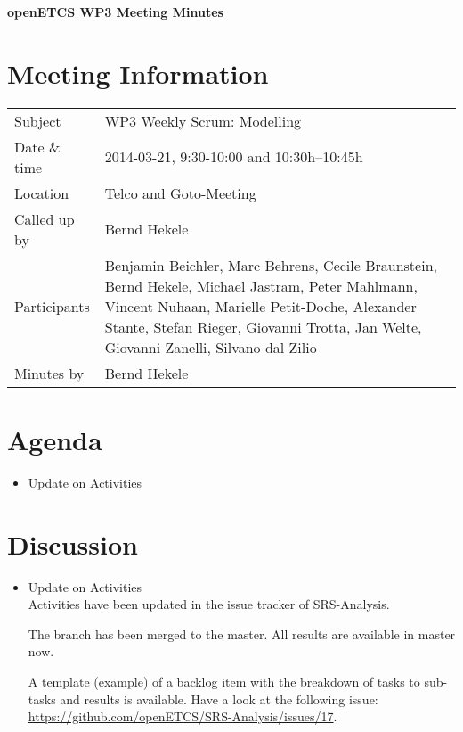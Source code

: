 \documentclass[a4paper, 11pt]{article}
\begin{document}
{\begin{center}\huge\bf openETCS WP3 Meeting Minutes\end{center}}
\section{Meeting Information}

\renewcommand{\arraystretch}{1.5}
\begin{supertabular}{m{.2\textwidth}m{.8\textwidth}}
Subject & WP3 Weekly Scrum: Modelling\\
Date \& time & 2014-03-21, 9:30-10:00 and 10:30h--10:45h\\
Location & Telco and Goto-Meeting\\
Called up by & Bernd Hekele\\
Participants &
Benjamin Beichler,
Marc Behrens,
Cecile Braunstein,
Bernd Hekele,
Michael Jastram,
Peter Mahlmann,
Vincent Nuhaan,
Marielle Petit-Doche,
Alexander Stante,
Stefan Rieger,
Giovanni Trotta,
Jan Welte,
Giovanni Zanelli,
Silvano dal Zilio
\\

Minutes by & Bernd Hekele\\
\end{supertabular}
\renewcommand{\arraystretch}{1.0}


\section{{Agenda}}
\begin{itemize}
\item Update on Activities
\end{itemize}

\section{Discussion}
\begin{itemize}
\item Update on Activities\\

Activities have been updated in the issue tracker of SRS-Analysis.

The branch has been merged to the master. All results are available in master now.

A template (example) of a backlog item with the breakdown of tasks to sub-tasks and results is available. Have a look at the following issue:
\url{https://github.com/openETCS/SRS-Analysis/issues/17}. 

\end{itemize}
\end{document}
